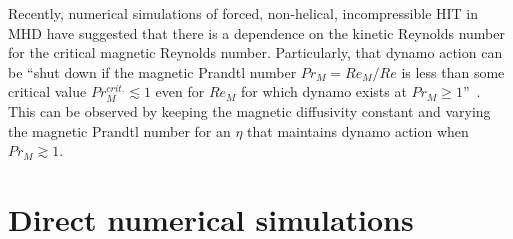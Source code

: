 \documentclass[12pt,a4paper]{report}
\begin{document}
Recently, numerical simulations of forced, non-helical, incompressible HIT in MHD have suggested that there is a dependence on the kinetic Reynolds number for the critical magnetic Reynolds number. Particularly, that dynamo action can be ``shut down if the magnetic Prandtl number $Pr_M = Re_M/Re$ is less than some critical value $Pr_M^{crit.} \lesssim 1$ even for $Re_M$ for which dynamo exists at $Pr_M \geq 1$''~\cite{schekochihin2004critical}. This can be observed by keeping the magnetic diffusivity constant and varying the magnetic Prandtl number for an $\eta$ that maintains dynamo action when $Pr_M\gtrsim1$.

\chapter{Direct numerical simulations}
\end{document}
